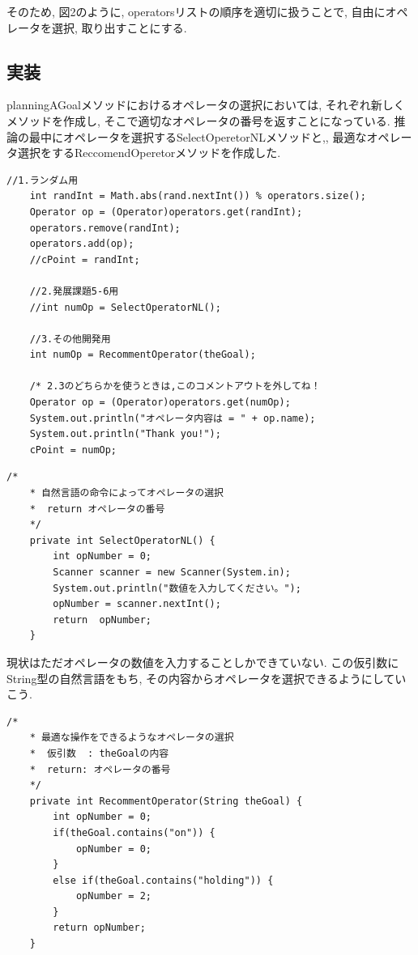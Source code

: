 \documentclass[uplatex,12pt]{jsarticle}
\begin{document}
そのため, 図2のように, operatorsリストの順序を適切に扱うことで, 自由にオペレータを選択, 取り出すことにする.


\subsection{実装}
planningAGoalメソッドにおけるオペレータの選択においては, それぞれ新しくメソッドを作成し, そこで適切なオペレータの番号を返すことになっている. 推論の最中にオペレータを選択するSelectOperetorNLメソッドと,, 最適なオペレータ選択をするReccomendOperetorメソッドを作成した.
\begin{lstlisting}[caption=オペレータ選択, label=src:No1]
	//1.ランダム用
	int randInt = Math.abs(rand.nextInt()) % operators.size();
  	Operator op = (Operator)operators.get(randInt);
	operators.remove(randInt);
	operators.add(op);
	//cPoint = randInt;

	//2.発展課題5-6用
	//int numOp = SelectOperatorNL();

	//3.その他開発用
	int numOp = RecommentOperator(theGoal);

	/* 2.3のどちらかを使うときは,このコメントアウトを外してね！
	Operator op = (Operator)operators.get(numOp);
	System.out.println("オペレータ内容は = " + op.name);
	System.out.println("Thank you!");
	cPoint = numOp;
\end{lstlisting}



\begin{lstlisting}[caption=推論中におけるオペレータ選択, label=src:No1]
     /*
	* 自然言語の命令によってオペレータの選択
	*  return オペレータの番号
	*/
	private int SelectOperatorNL() {
		int opNumber = 0;
		Scanner scanner = new Scanner(System.in);
		System.out.println("数値を入力してください。");
		opNumber = scanner.nextInt();
	 	return	opNumber;
	}

\end{lstlisting}
現状はただオペレータの数値を入力することしかできていない. この仮引数にString型の自然言語をもち, その内容からオペレータを選択できるようにしていこう. 

\begin{lstlisting}[caption=最適なオペレータ選択, label=src:No1]
     /*
	* 最適な操作をできるようなオペレータの選択
	*  仮引数  : theGoalの内容
	*  return: オペレータの番号
	*/
	private int RecommentOperator(String theGoal) {
		int opNumber = 0;
		if(theGoal.contains("on")) {
			opNumber = 0;
		}
		else if(theGoal.contains("holding")) {
			opNumber = 2;
		}
		return opNumber;
	}
\end{lstlisting}
\end{document}
